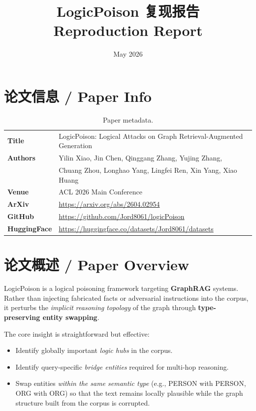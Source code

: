 \documentclass[11pt,a4paper]{article}
\title{%
  \textbf{LogicPoison 复现报告} \\[6pt]
  \large Reproduction Report%
}
\author{}
\date{May 2026}
\begin{document}
\maketitle

\section{论文信息 / Paper Info}

\begin{table}[H]
\centering
\begin{tabular}{>{\bfseries}l l}
\toprule
Title       & LogicPoison: Logical Attacks on Graph Retrieval-Augmented Generation \\
Authors     & Yilin Xiao, Jin Chen, Qinggang Zhang, Yujing Zhang, \\
            & Chuang Zhou, Longhao Yang, Lingfei Ren, Xin Yang, Xiao Huang \\
Venue       & ACL 2026 Main Conference \\
ArXiv       & \url{https://arxiv.org/abs/2604.02954} \\
GitHub      & \url{https://github.com/Jord8061/logicPoison} \\
HuggingFace & \url{https://huggingface.co/datasets/Jord8061/datasets} \\
\bottomrule
\end{tabular}
\caption{Paper metadata.}
\end{table}

\section{论文概述 / Paper Overview}

LogicPoison is a logical poisoning framework targeting \textbf{GraphRAG} systems.
Rather than injecting fabricated facts or adversarial instructions into the corpus,
it perturbs the \emph{implicit reasoning topology} of the graph through
\textbf{type-preserving entity swapping}.

The core insight is straightforward but effective:
\begin{itemize}[nosep]
  \item Identify globally important \emph{logic hubs} in the corpus.
  \item Identify query-specific \emph{bridge entities} required for multi-hop reasoning.
  \item Swap entities \emph{within the same semantic type} (e.g., PERSON with PERSON,
        ORG with ORG) so that the text remains locally plausible while the graph
        structure built from the corpus is corrupted.
\end{itemize}
\end{document}
